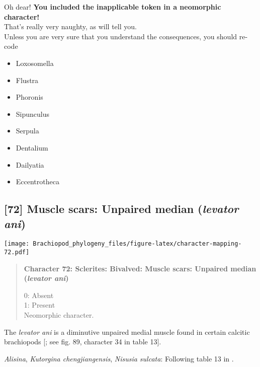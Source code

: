 \documentclass[openany]{book}
\providecommand{\tightlist}{%
  \setlength{\itemsep}{0pt}\setlength{\parskip}{0pt}}
\theoremstyle{definition}
\theoremstyle{definition}
\theoremstyle{definition}
\theoremstyle{remark}
\begin{document}
Oh dear! \textbf{You included the inapplicable token in a neomorphic
character!}\\
That's really very naughty, as \citet{Brazeau2018} will tell you.\\
Unless you are very sure that you understand the consequences, you
should re-code

\begin{itemize}
\tightlist
\item
  Loxosomella\\
\item
  Flustra\\
\item
  Phoronis\\
\item
  Sipunculus\\
\item
  Serpula\\
\item
  Dentalium\\
\item
  Dailyatia\\
\item
  Eccentrotheca
\end{itemize}

\subsection*{\texorpdfstring{{[}72{]} Muscle scars: Unpaired median
(\emph{levator
ani})}{{[}72{]} Muscle scars: Unpaired median (levator ani)}}\label{muscle-scars-unpaired-median-levator-ani}

\texttt{[image: Brachiopod\_phylogeny\_files/figure-latex/character-mapping-72.pdf]}

\begin{quote}
\textbf{Character 72: Sclerites: Bivalved: Muscle scars: Unpaired median
(\emph{levator ani})}

0: Absent\\
1: Present\\
Neomorphic character.
\end{quote}

The \emph{levator ani} is a diminutive unpaired medial muscle found in
certain calcitic brachiopods
{[}\citet{Williams2000LinguliformeaCraniiformea}; see fig. 89, character
34 in table 13{]}.

\hypertarget{Alisina-coding-72}{}
\emph{Alisina}, \emph{Kutorgina chengjiangensis}, \emph{Nisusia
sulcata}: Following table 13 in
\citet{Williams2000LinguliformeaCraniiformea}.
\end{document}
